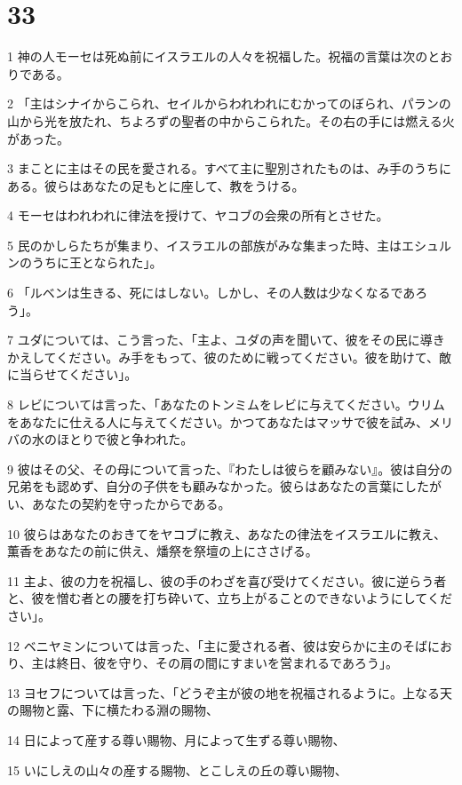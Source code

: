 \chapter{33}

\par 1 神の人モーセは死ぬ前にイスラエルの人々を祝福した。祝福の言葉は次のとおりである。
\par 2 「主はシナイからこられ、セイルからわれわれにむかってのぼられ、パランの山から光を放たれ、ちよろずの聖者の中からこられた。その右の手には燃える火があった。
\par 3 まことに主はその民を愛される。すべて主に聖別されたものは、み手のうちにある。彼らはあなたの足もとに座して、教をうける。
\par 4 モーセはわれわれに律法を授けて、ヤコブの会衆の所有とさせた。
\par 5 民のかしらたちが集まり、イスラエルの部族がみな集まった時、主はエシュルンのうちに王となられた」。
\par 6 「ルベンは生きる、死にはしない。しかし、その人数は少なくなるであろう」。
\par 7 ユダについては、こう言った、「主よ、ユダの声を聞いて、彼をその民に導きかえしてください。み手をもって、彼のために戦ってください。彼を助けて、敵に当らせてください」。
\par 8 レビについては言った、「あなたのトンミムをレビに与えてください。ウリムをあなたに仕える人に与えてください。かつてあなたはマッサで彼を試み、メリバの水のほとりで彼と争われた。
\par 9 彼はその父、その母について言った、『わたしは彼らを顧みない』。彼は自分の兄弟をも認めず、自分の子供をも顧みなかった。彼らはあなたの言葉にしたがい、あなたの契約を守ったからである。
\par 10 彼らはあなたのおきてをヤコブに教え、あなたの律法をイスラエルに教え、薫香をあなたの前に供え、燔祭を祭壇の上にささげる。
\par 11 主よ、彼の力を祝福し、彼の手のわざを喜び受けてください。彼に逆らう者と、彼を憎む者との腰を打ち砕いて、立ち上がることのできないようにしてください」。
\par 12 ベニヤミンについては言った、「主に愛される者、彼は安らかに主のそばにおり、主は終日、彼を守り、その肩の間にすまいを営まれるであろう」。
\par 13 ヨセフについては言った、「どうぞ主が彼の地を祝福されるように。上なる天の賜物と露、下に横たわる淵の賜物、
\par 14 日によって産する尊い賜物、月によって生ずる尊い賜物、
\par 15 いにしえの山々の産する賜物、とこしえの丘の尊い賜物、
